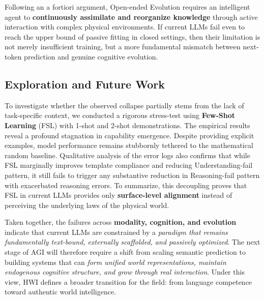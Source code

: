 Following an a fortiori argument, Open-ended Evolution requires an intelligent agent to \textbf{continuously assimilate and reorganize knowledge} through active interaction with complex physical environments. 
If current LLMs fail even to reach the upper bound of passive fitting in closed settings, then their limitation is not merely insufficient training, but a more fundamental mismatch between next-token prediction and genuine cognitive evolution. 


\subsection{Exploration and Future Work}
\label{future}

To investigate whether the observed collapse partially stems from the lack of task-specific context, we conducted a rigorous stress-test using \textbf{Few-Shot Learning} (FSL) with 1-shot and 2-shot demonstrations. 
The empirical results reveal a profound stagnation in capability emergence. Despite providing explicit examples, model performance remains stubbornly tethered to the mathematical random baseline. 
Qualitative analysis of the error logs also confirms that while FSL marginally improves template compliance and reducing Understanding-fail pattern, it still fails to trigger any substantive reduction in Reasoning-fail pattern with exacerbated reasoning errors. 
To summarize, this decoupling proves that FSL in current LLMs provides only \textbf{surface-level alignment} instead of perceiving the underlying laws of the physical world. 

Taken together, the failures across \textbf{modality, cognition, and evolution} indicate that current LLMs are constrained by a \emph{paradigm that remains fundamentally text-bound, externally scaffolded, and passively optimized}. 
The next stage of AGI will therefore require a shift from scaling semantic prediction to building systems that can \emph{form unified world representations, maintain endogenous cognitive structure, and grow through real interaction}. 
Under this view, HWI defines a broader transition for the field: from language competence toward authentic world intelligence.

